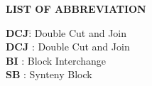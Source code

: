 \begin{center}
  \textbf{{\Large LIST OF ABBREVIATION}}\\[60pt]
\end{center}

\begin{tabbing}
  \textbf{DCJ}\quad\= : \= Double Cut and Join\kill\\
  \textbf{DCJ}\quad\> : \> Double Cut and Join\\
  \textbf{BI}\quad\> : \> Block Interchange\\
  \textbf{SB}\quad\> : \> Synteny Block\\
\end{tabbing}

\endinput